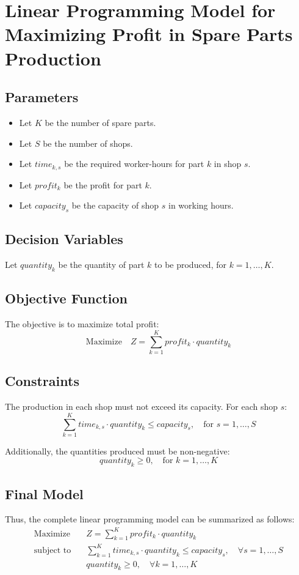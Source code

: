 \documentclass{article}
\begin{document}
\section*{Linear Programming Model for Maximizing Profit in Spare Parts Production}

\subsection*{Parameters}
\begin{itemize}
    \item Let \( K \) be the number of spare parts.
    \item Let \( S \) be the number of shops.
    \item Let \( time_{k,s} \) be the required worker-hours for part \( k \) in shop \( s \).
    \item Let \( profit_k \) be the profit for part \( k \).
    \item Let \( capacity_s \) be the capacity of shop \( s \) in working hours.
\end{itemize}

\subsection*{Decision Variables}
Let \( quantity_k \) be the quantity of part \( k \) to be produced, for \( k = 1, \ldots, K \).

\subsection*{Objective Function}
The objective is to maximize total profit:
\[
\text{Maximize} \quad Z = \sum_{k=1}^{K} profit_k \cdot quantity_k
\]

\subsection*{Constraints}
The production in each shop must not exceed its capacity. For each shop \( s \):
\[
\sum_{k=1}^{K} time_{k,s} \cdot quantity_k \leq capacity_s, \quad \text{for } s = 1, \ldots, S
\]

Additionally, the quantities produced must be non-negative:
\[
quantity_k \geq 0, \quad \text{for } k = 1, \ldots, K
\]

\subsection*{Final Model}
Thus, the complete linear programming model can be summarized as follows:
\begin{align*}
\text{Maximize} & \quad Z = \sum_{k=1}^{K} profit_k \cdot quantity_k \\
\text{subject to} & \quad \sum_{k=1}^{K} time_{k,s} \cdot quantity_k \leq capacity_s, \quad \forall s = 1, \ldots, S \\
& \quad quantity_k \geq 0, \quad \forall k = 1, \ldots, K
\end{align*}
\end{document}
